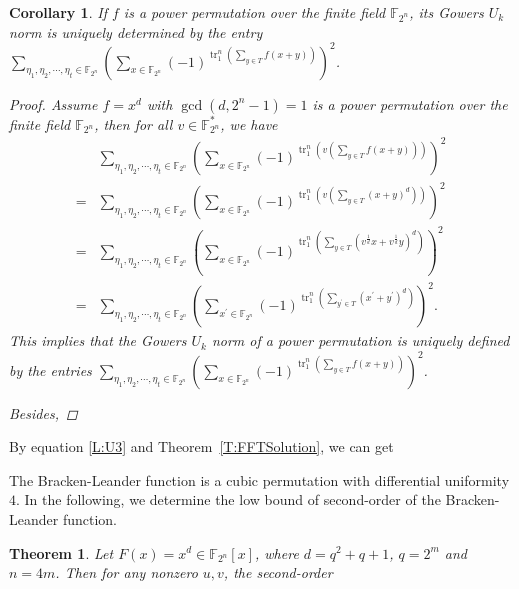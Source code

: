 \documentclass[12 pt]{article}
\newtheorem{theorem}{Theorem}
\newtheorem{corollary}{Corollary}
\def\F{{\mathbb F}}
\newcommand{\tr}{\operatorname{tr}_1^n}
\begin{document}
  \begin{corollary}
    If $ f $ is a power permutation over the finite field $ \F_{2^n} $, its Gowers $ U_k $ norm is uniquely determined by the entry $ \sum_{\eta_1,\eta_2, \cdots, \eta_t \in\F_{2^n}}\left(\sum_{x\in\F_{2^n}}(-1)^{\tr\left(\sum_{y\in T}f(x+y)\right)}\right)^2 $. 
    \begin{proof}
      Assume $ f=x^d $ with $ \gcd(d,2^n-1)=1 $ is a power permutation over the finite field $ \F_{2^n} $, 
      then for all $ v\in\F_{2^{n}}^* $, we have 
      \begin{align*}
        &\sum_{\eta_1,\eta_2, \cdots, \eta_t \in\F_{2^n}}\left(\sum_{x\in\F_{2^n}}(-1)^{\tr\left( v\left(\sum_{y\in T}f(x+y)\right)\right)}\right)^2\\=&\sum_{\eta_1,\eta_2, \cdots, \eta_t \in\F_{2^n}}\left(\sum_{x\in\F_{2^n}}(-1)^{\tr\left( v\left(\sum_{y\in T}(x+y)^d \right)\right)}\right)^2\\
        =&\sum_{\eta_1,\eta_2, \cdots, \eta_t \in\F_{2^n}}\left(\sum_{x\in\F_{2^n}}(-1)^{\tr\left(\sum_{y\in T}\left(v^{\frac{1}{d}}x+v^{\frac{1}{d}}y\right)^d\right)}\right)^2\\
        =&\sum_{\eta_1,\eta_2, \cdots, \eta_t \in\F_{2^n}}\left(\sum_{x^{\prime}\in\F_{2^n}}(-1)^{\tr\left(\sum_{y^{\prime}\in T}\left(x^{\prime}+y^{\prime}\right)^d\right)}\right)^2.
      \end{align*}
      This implies that the Gowers $ U_k $ norm of a power permutation is uniquely defined by the entries 
      $ \sum_{\eta_1,\eta_2, \cdots, \eta_t \in\F_{2^n}}\left(\sum_{x\in\F_{2^n}}(-1)^{\tr\left(\sum_{y\in T}f(x+y)\right)}\right)^2 $.  
      
      Besides, 
    \end{proof}
  \end{corollary}


By equation \eqref{L:U3} and Theorem~\ref{T:FFTSolution}, we can get 

The Bracken-Leander function is a cubic permutation with differential uniformity $ 4 $. 
In the following, we determine the low bound of second-order of the Bracken-Leander function.

\begin{theorem}
  Let $ F(x) = x^d \in\F_{2^n}[x] $, where $ d=q^2+q+1 $, $ q = 2^m $ and $ n=4m $. 
  Then for any nonzero $ u,v $, the second-order 
\end{theorem}
\end{document}
